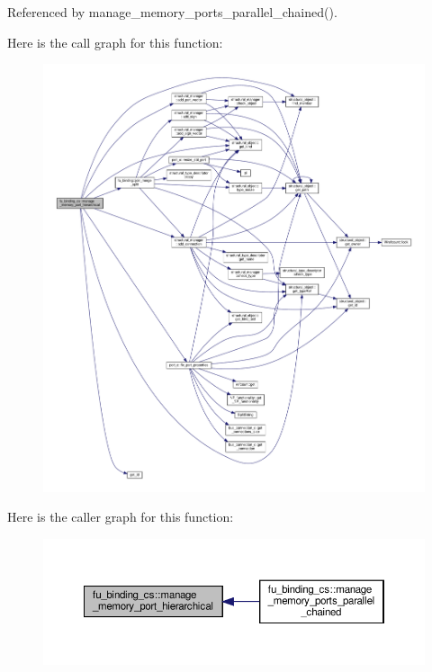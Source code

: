 Referenced by manage\+\_\+memory\+\_\+ports\+\_\+parallel\+\_\+chained().

Here is the call graph for this function\+:
\nopagebreak
\begin{figure}[H]
\begin{center}
\leavevmode
\includegraphics[width=350pt]{d4/d7b/classfu__binding__cs_afaba387982e2d00b6269055728c53cfd_cgraph}
\end{center}
\end{figure}
Here is the caller graph for this function\+:
\nopagebreak
\begin{figure}[H]
\begin{center}
\leavevmode
\includegraphics[width=350pt]{d4/d7b/classfu__binding__cs_afaba387982e2d00b6269055728c53cfd_icgraph}
\end{center}
\end{figure}
\mbox{\label{classfu__binding__cs_a96110f5b42db5729356de61f5824bdce}} 
